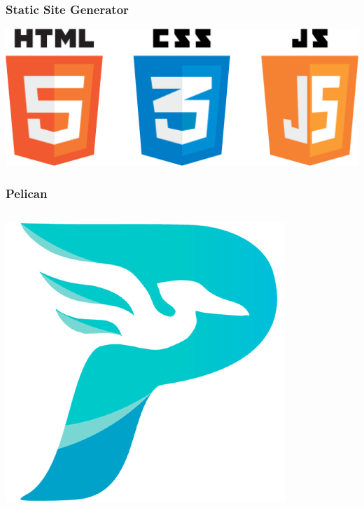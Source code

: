 \begin{frame}
	\frametitle{Static Site Generator}
	\begin{center}
		\includegraphics[scale=0.2]{img/html}
	\end{center}
\end{frame}

\begin{frame}
	\frametitle{Pelican}
	\begin{columns}
		\begin{center}
			\includegraphics[scale=0.2]{img/pelican_logo}
		\end{center}
		\begin{center}
		\end{center}
	\end{columns}
\end{frame}

